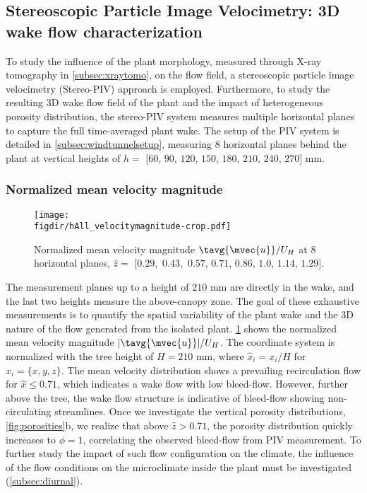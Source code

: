 \subsection{Stereoscopic Particle Image Velocimetry: 3D wake flow characterization }
\label{subsec:stereopiv}

To study the influence of the plant morphology, measured through X-ray tomography in \cref{subsec:xraytomo}, on the flow field, a stereoscopic particle image velocimetry (Stereo-PIV) approach is employed. Furthermore, to study the resulting 3D wake flow field of the plant and the impact of heterogeneous porosity distribution, the stereo-PIV system measures multiple horizontal planes to capture the full time-averaged plant wake. The setup of the PIV system is detailed in \cref{subsec:windtunnelsetup}, measuring 8 horizontal planes behind the plant at vertical heights of $h =$ $[60$, $90$, $120$, $150$, $180$, $210$, $240$, $270]$ mm.

\subsubsection*{Normalized mean velocity magnitude}
	
\begin{sidewaysfigure}[p]
	\centering
	\texttt{[image: \\figdir/hAll\_velocitymagnitude-crop.pdf]}
	\caption{Normalized mean velocity magnitude $\tavg{\mvec{u}}/U_H$ at 8 horizontal planes, $\hat{z}=$ [$0.29$,~$0.43$,~$0.57$, $0.71$, $0.86$, $1.0$, $1.14$, $1.29]$.}
	\label{fig:meanflow}
\end{sidewaysfigure}

The measurement planes up to a height of $210$ mm are directly in the wake, and the last two heights measure the above-canopy zone. The goal of these exhaustive measurements is to quantify the spatial variability of the plant wake and the 3D nature of the flow generated from the isolated plant. \cref{fig:meanflow} shows the normalized mean velocity magnitude $|\tavg{\mvec{u}}|/U_H$. The coordinate system is normalized with the tree height of $H=210$ mm, where $\hat{x}_i = x_i / H$ for $x_i =\{x,y,z\}$. The mean velocity distribution shows a prevailing recirculation flow for $\hat{x} \le 0.71$, which indicates a wake flow with low bleed-flow. However, further above the tree, the wake flow structure is indicative of bleed-flow showing non-circulating streamlines. Once we investigate the vertical porosity distributions, \cref{fig:porosities}b, we realize that above $\hat{z}>0.71$, the porosity distribution quickly increases to $\phi=1$, correlating the observed bleed-flow from PIV measurement. To further study the impact of such flow configuration on the climate, the influence of the flow conditions on the microclimate inside the plant must be investigated (\cref{subsec:diurnal}). 


